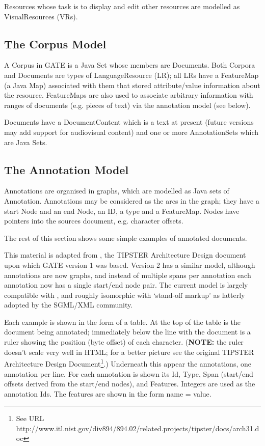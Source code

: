 Resources whose task is to display and edit other resources are modelled as 
VisualResources (VRs).

\subsection{The Corpus Model}


A Corpus
in GATE is a Java Set whose members are 
Documents.
Both Corpora and Documents are types of 
LanguageResource (LR); all
LRs have a 
FeatureMap
(a Java Map) associated with them that
stored attribute/value information about the resource. FeatureMaps are also
used to associate arbitrary information with ranges of documents (e.g. pieces
of text) via the annotation model (see below).

Documents have a
DocumentContent which is
a text at present (future versions may add support for audiovisual content)
and one or more
AnnotationSets which are Java
Sets.

\subsection{The Annotation Model}


Annotations are organised in graphs, which are modelled as 
Java sets of 
Annotation.
Annotations may be considered as the arcs in the graph; they have a start 
Node and an end Node, an ID, a type and a
FeatureMap. Nodes have pointers into the sources document, e.g. character
offsets.

The rest of this section
shows some simple examples of annotated documents.

This material is adapted from \cite{Gri96b}, the TIPSTER Architecture Design
document upon which GATE version 1 was based. Version 2 has a similar model,
although annotations are now graphs, and instead of multiple spans per
annotation each annotation now has a single start/end node pair. The current
model is largely compatible with \cite{Bir99}, and roughly isomorphic with
`stand-off markup' as latterly adopted by the SGML/XML community.

Each example is shown in the form of a table. At the top of the table is the
document being annotated; immediately below the line with the document is a
ruler showing the position (byte offset) of each character.
({\bf NOTE:} the ruler doesn't scale very well in HTML; for a better picture 
see the original
TIPSTER Architecture Design Document\footnote{See URL http://www.itl.nist.gov/div894/894.02/related.projects/tipster/docs/arch31.doc}.)
Underneath this
appear the annotations, one annotation per line. For each annotation is shown
its Id, Type, Span (start/end offsets derived from the start/end nodes),
and Features. Integers are used as the annotation Ids.  The
features are shown in the form name = value.

